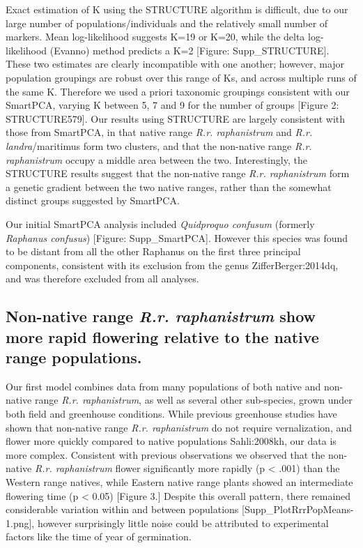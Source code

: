 \documentclass[twocolumn]{bmcart}%
\begin{document}
Exact estimation of K using the STRUCTURE algorithm is difficult, due to our large number of populations/individuals and the relatively small number of markers. Mean log-likelihood suggests K=19 or K=20, while the delta log-likelihood (Evanno) method predicts a K=2 [Figure: Supp\_STRUCTURE]. These two estimates are clearly incompatible with one another; however, major population groupings are robust over this range of Ks, and across multiple runs of the same K. Therefore we used a priori taxonomic groupings consistent with our SmartPCA, varying K between 5, 7 and 9 for the number of groups [Figure 2: STRUCTURE579]. Our results using STRUCTURE are largely consistent with those from SmartPCA, in that native range \textit{R.r. raphanistrum} and \textit{R.r. landra}/maritimus form two clusters, and that the non-native range \textit{R.r. raphanistrum} occupy a middle area between the two. Interestingly, the STRUCTURE results suggest that the non-native range \textit{R.r. raphanistrum} form a genetic gradient between the two native ranges, rather than the somewhat distinct groups suggested by SmartPCA.

Our initial SmartPCA analysis included \textit{Quidproquo confusum} (formerly \textit{Raphanus confusus}) [Figure: Supp\_SmartPCA]. However this species was found to be distant from all the other Raphanus on the first three principal components, consistent with its exclusion from the genus {ZifferBerger:2014dq}, and was therefore excluded from all analyses.

\subsection*{Non-native range \textit{R.r. raphanistrum} show more rapid flowering relative to the native range populations.}

Our first model combines data from many populations of both native and non-native range \textit{R.r. raphanistrum}, as well as several other sub-species, grown under both field and greenhouse conditions. While previous greenhouse studies have shown that non-native range \textit{R.r. raphanistrum} do not require vernalization, and flower more quickly compared to native populations {Sahli:2008kh}, our data is more complex. Consistent with previous observations we observed that the non-native \textit{R.r. raphanistrum} flower significantly more rapidly (p < .001) than the Western range natives, while Eastern native range plants showed an intermediate flowering time (p < 0.05) [Figure 3.] Despite this overall pattern, there remained considerable variation within and between populations [Supp\_PlotRrrPopMeans-1.png], however surprisingly little noise could be attributed to experimental factors like the time of year of germination.
%
%
%
\end{document}
